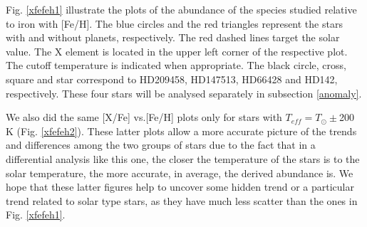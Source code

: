\documentclass[dvips,12pt,a4paper]{report}
\begin{document}
{{Fig. \ref{xfefeh1} illustrate the plots of the abundance of the species studied relative to iron with [Fe/H]. The blue circles and the red triangles represent the stars with and without planets, respectively. The red dashed lines target the solar value. The X element is located in the upper left corner of the respective plot. The cutoff temperature is indicated when appropriate. The black circle, cross, square and star correspond to HD209458, HD147513, HD66428 and HD142, respectively. These four stars will be analysed separately in subsection \ref{anomaly}.

We also did the same [X/Fe] vs.[Fe/H] plots only for stars with $T_{eff}=T_\odot\pm$200 K (Fig. \ref{xfefeh2}). These latter plots allow a more accurate picture of the trends and differences among the two groups of stars due to the fact that in a differential analysis like this one, the closer the temperature of the stars is to the solar temperature, the more accurate, in average, the derived abundance is. We hope that these latter figures help to uncover some hidden trend or a particular trend related to solar type stars, as they have much less scatter than the ones in Fig. \ref{xfefeh1}.

}}
\end{document}
